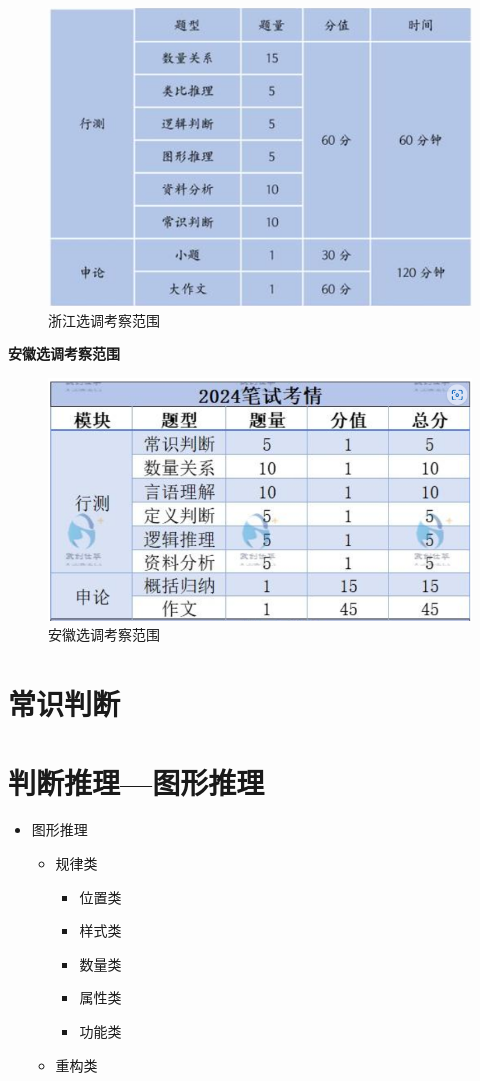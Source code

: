 \documentclass{article}
\numberwithin{equation}{section}						%
\numberwithin{figure}{section}							%
\begin{document}
\begin{sloppypar}
\begin{figure}[H]
     \centering
     \includegraphics[width=0.6\linewidth]{0.png}
		\caption{浙江选调考察范围}
 \end{figure}

\textbf{安徽选调考察范围}

\begin{figure}[H]
     \centering
     \includegraphics[width=0.6\linewidth]{00.png}
		\caption{安徽选调考察范围}
 \end{figure}

\section{常识判断}






\section{判断推理---图形推理}

\begin{itemize}
    \item 图形推理
    \begin{itemize}
        \item 规律类
\begin{itemize}
    \item 位置类
    \item 样式类
    \item 数量类
    \item 属性类
    \item 功能类
\end{itemize}
        \item 重构类
    

\end{itemize}
\end{itemize}
\end{sloppypar}
\end{document}
